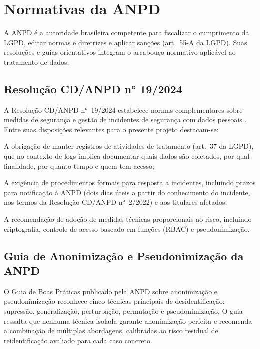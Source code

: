 \section{Normativas da ANPD}
\label{sec:anpd}

A ANPD é a autoridade brasileira competente para fiscalizar o cumprimento da LGPD, editar normas e diretrizes e aplicar sanções (art.\ 55-A da LGPD). Suas resoluções e guias orientativos integram o arcabouço normativo aplicável ao tratamento de dados.

\subsection{Resolução CD/ANPD n° 19/2024}
\label{subsec:resolucao-19}

A Resolução CD/ANPD n°~19/2024 estabelece normas complementares sobre medidas de segurança e gestão de incidentes de segurança com dados pessoais \cite{anpd2024resolucao}. Entre suas disposições relevantes para o presente projeto destacam-se:

\begin{alineas}
    \item A obrigação de manter registros de atividades de tratamento (art.\ 37 da LGPD), que no contexto de logs implica documentar quais dados são coletados, por qual finalidade, por quanto tempo e quem tem acesso;
    \item A exigência de procedimentos formais para resposta a incidentes, incluindo prazos para notificação à ANPD (dois dias úteis a partir do conhecimento do incidente, nos termos da Resolução CD/ANPD n°~2/2022) e aos titulares afetados;
    \item A recomendação de adoção de medidas técnicas proporcionais ao risco, incluindo criptografia, controle de acesso baseado em funções (RBAC) e pseudonimização.
\end{alineas}

\subsection{Guia de Anonimização e Pseudonimização da ANPD}
\label{subsec:guia-anpd}

O Guia de Boas Práticas publicado pela ANPD sobre anonimização e pseudonimização \cite{anpd2022anonimizacao} reconhece cinco técnicas principais de desidentificação: supressão, generalização, perturbação, permutação e pseudonimização. O guia ressalta que nenhuma técnica isolada garante anonimização perfeita e recomenda a combinação de múltiplas abordagens, calibradas ao risco residual de reidentificação avaliado para cada caso concreto.

